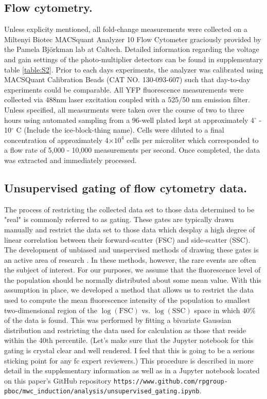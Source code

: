 
\subsection{Flow cytometry.}
Unless explicity mentioned, all fold-change measurements were collected on a
Miltenyi Biotec MACSquant Analyzer 10 Flow Cytometer graciously provided by the
Pamela Bj\"{o}rkman lab at Caltech. Detailed information regarding the voltage
and gain  settings of the photo-multiplier detectors can be found in
supplementary table \ref{table:S2}. Prior to each days experiments, the
analyzer was calibrated using MACSQuant Calibration Beads (CAT NO. 130-093-607)
such that day-to-day experiments could be comparable. All YFP fluorescence
measurements were collected via 488nm laser excitation  coupled with a 525/50
nm emission filter. Unless specified, all measurments were  taken over the
course of two to three hours using automated sampling from a 96-well plated
kept at approximately 4$^\circ$ - 10$^\circ$ C \griffinComment(Include the
ice-block-thing name). Cells were diluted to a final concentration of
approximately 4$\times 10^{4}$ cells per microliter which corresponded to a
flow rate of 5,000 - 10,000 measurements per second. Once completed, the data
was extracted and immediately  processed.

\subsection{Unsupervised gating of flow cytometry data.}
The process of restricting the collected data set to those data determined to
be  "real" is commonly referred to as gating. These gates are typically drawn
manually \cite{Maecker2005} and restrict the data set to those data which
desplay a high degree of linear correlation  between their forward-scatter
(FSC) and side-scatter (SSC). The development of unbiased and unspervised
methods of drawing these gates is an active area of research
\cite{Agaheepour2013, Lo2008}. In these methods, however, the rare events are
often the subject of interest. For our purposes, we assume that the
fluorescence level of the population should be normally distributed about some
mean value. With this  assumption in place, we developed a method that allows
us to restrict the data used  to compute the mean fluorescence intensity of the
population to smallest two-dimensional  region of the $\log(\mathrm{FSC})$ vs.
$\log(\mathrm{SSC})$ space in which 40\% of the data is found. This  was
performed by fitting a bivariate Gaussian distribution and restricting the
data used for calculation as those that reside within the 40th percentile.
\griffinComment(Let's make sure that the Jupyter notebook for this gating is
crystal clear and well rendered. I feel that this is going to be a serious
sticking point for any fc expert reviewers.) This procedure is  described in
more detail in the supplementary information as well as in a  Jupyter notebook
located on this paper's GitHub repository
\texttt{https://www.github.com/rpgroup-pboc/mwc_induction/analysis/unsupervised_gating.ipynb}.

